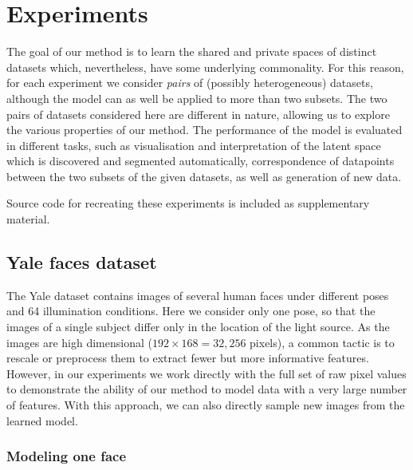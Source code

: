 \section{Experiments \label{experiments}}
The goal of our method is to learn the shared and private spaces of distinct datasets which, nevertheless, have some underlying commonality.
For this reason, for each experiment we consider \emph{pairs} of (possibly heterogeneous) datasets, although the model can as well be applied
to more than two subsets.
The two pairs of datasets considered here are different in nature, allowing us to explore the various properties of our method. 
%
%
The performance of the model is evaluated in different tasks, such as visualisation and interpretation
of the latent space which is discovered and segmented automatically, correspondence of datapoints between the two subsets of the given
datasets, as well as generation of new data.

Source code for recreating these experiments is included as supplementary material.

\subsection{Yale faces dataset}
The Yale dataset \cite{YaleFaces1, YaleFaces2} contains images of several human faces under different poses and 64 illumination conditions.
Here we consider only one pose, so that the images of a single subject differ only in the location of the light source.
As the images are high dimensional ($192 \times 168 = 32,256$ pixels), a common tactic is to rescale or preprocess them
 to extract fewer but more informative features. However, in our experiments we work directly
with the full set of raw pixel values to demonstrate the ability of our method to model data with a very large number of features. 
With this approach, we can also directly sample new images from the learned model.

\subsubsection{Modeling one face}

